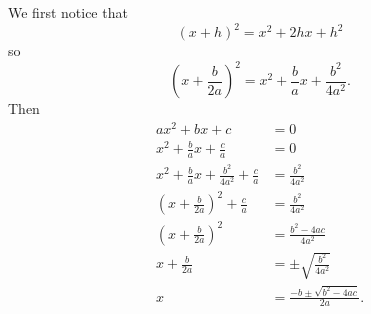 \documentclass{book}
\begin{document}
\begin{exercise*}[{\ref{completesquare}}] We first notice that
\[(x + h)^2 = x^2 + 2hx + h^2\] so \[\left(x + \frac{b}{2a}\right)^2 = x^2 + \frac{b}{a}x + \frac{b^2}{4a^2}.\] Then
\begin{align*}
ax^2 + bx + c &= 0\\
x^2 + \frac{b}{a}x + \frac{c}{a} &= 0\\
x^2 + \frac{b}{a}x + \frac{b^2}{4a^2} + \frac{c}{a} &= \frac{b^2}{4a^2}\\
\left(x + \frac{b}{2a}\right)^2 + \frac{c}{a} &= \frac{b^2}{4a^2}\\
\left(x + \frac{b}{2a}\right)^2 &= \frac{b^2-4ac}{4a^2}\\
x + \frac{b}{2a} &= \pm\sqrt{\frac{b^2}{4a^2}}\\
x &= \frac{-b \pm \sqrt{b^2 - 4ac}}{2a}.
\end{align*}
\end{exercise*}
\end{document}
